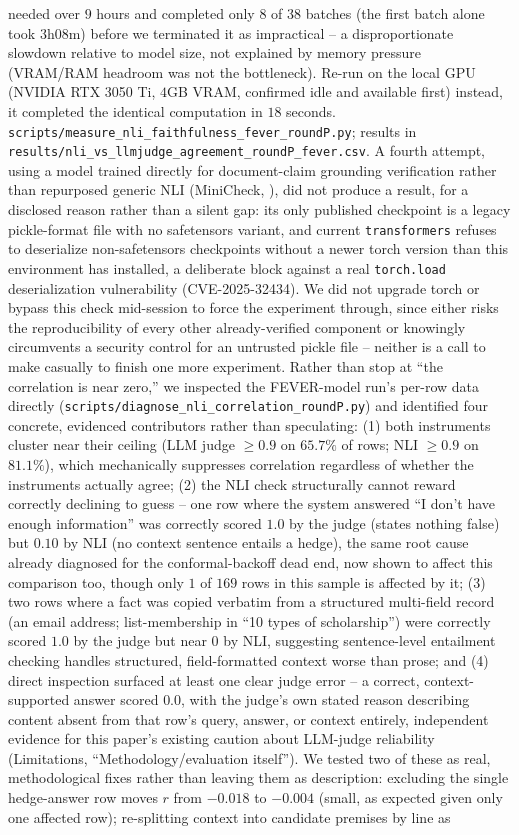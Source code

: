 \documentclass[a4paper,twoside]{article}
\begin{document}
needed over $9$ hours and completed only $8$ of $38$ batches (the first batch alone took $3$h$08$m) before we terminated it as impractical -- a disproportionate slowdown relative to model size, not explained by memory pressure (VRAM/RAM headroom was not the bottleneck). Re-run on the local GPU (NVIDIA RTX 3050 Ti, $4$GB VRAM, confirmed idle and available first) instead, it completed the identical computation in $18$ seconds. \texttt{scripts/measure\_nli\_faithfulness\_fever\_roundP.py}; results in \texttt{results/nli\_vs\_llmjudge\_agreement\_roundP\_fever.csv}. A fourth attempt, using a model trained directly for document-claim grounding verification rather than repurposed generic NLI (MiniCheck, \citealp{tang2024minicheck}), did not produce a result, for a disclosed reason rather than a silent gap: its only published checkpoint is a legacy pickle-format file with no safetensors variant, and current \texttt{transformers} refuses to deserialize non-safetensors checkpoints without a newer torch version than this environment has installed, a deliberate block against a real \texttt{torch.load} deserialization vulnerability (CVE-2025-32434). We did not upgrade torch or bypass this check mid-session to force the experiment through, since either risks the reproducibility of every other already-verified component or knowingly circumvents a security control for an untrusted pickle file -- neither is a call to make casually to finish one more experiment. Rather than stop at ``the correlation is near zero,'' we inspected the FEVER-model run's per-row data directly (\texttt{scripts/diagnose\_nli\_correlation\_roundP.py}) and identified four concrete, evidenced contributors rather than speculating: (1) both instruments cluster near their ceiling (LLM judge $\geq0.9$ on $65.7\%$ of rows; NLI $\geq0.9$ on $81.1\%$), which mechanically suppresses correlation regardless of whether the instruments actually agree; (2) the NLI check structurally cannot reward correctly declining to guess -- one row where the system answered ``I don't have enough information'' was correctly scored $1.0$ by the judge (states nothing false) but $0.10$ by NLI (no context sentence entails a hedge), the same root cause already diagnosed for the conformal-backoff dead end, now shown to affect this comparison too, though only $1$ of $169$ rows in this sample is affected by it; (3) two rows where a fact was copied verbatim from a structured multi-field record (an email address; list-membership in ``10 types of scholarship'') were correctly scored $1.0$ by the judge but near $0$ by NLI, suggesting sentence-level entailment checking handles structured, field-formatted context worse than prose; and (4) direct inspection surfaced at least one clear judge error -- a correct, context-supported answer scored $0.0$, with the judge's own stated reason describing content absent from that row's query, answer, or context entirely, independent evidence for this paper's existing caution about LLM-judge reliability (Limitations, ``Methodology/evaluation itself''). We tested two of these as real, methodological fixes rather than leaving them as description: excluding the single hedge-answer row moves $r$ from $-0.018$ to $-0.004$ (small, as expected given only one affected row); re-splitting context into candidate premises by line as 
\end{document}

